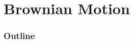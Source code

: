 


\newcommand{\RR}{\mathbf R}
\newcommand{\CC}{\mathbf C}
\newcommand{\ZZ}{\mathbf Z}
\newcommand{\ZZn}[1]{\ZZ/{#1}\ZZ}
\newcommand{\QQ}{\mathbf Q}
\newcommand{\rr}{\mathbb R}
\newcommand{\cc}{\mathbb C}
\newcommand{\zz}{\mathbb Z}
\newcommand{\zzn}[1]{\zz/{#1}\zz}
\newcommand{\qq}{\mathbb Q}
\newcommand{\calM}{\mathcal M}
\newcommand{\latex}{\LaTeX}
\newcommand{\tex}{\TeX}
\newcommand{\sm}{\setminus} 


\newcommand{\tfix}{\rule{0pt}{2.6ex}}
\newcommand{\bfix}{\rule[-1.2ex]{0pt}{0pt}}



\newcommand{\intf}[1]{\int_a^b{#1}\,dx}
\newcommand{\intfb}[3]{\int_{#1}^{#2}{#3}\,dx}
\newcommand{\marginalfootnote}[1]{%
        \footnote{#1}
        \marginpar[\hfill{\sf\thefootnote}]{{\sf\thefootnote}}}
\newcommand{\edit}[1]{\marginalfootnote{#1}}


\newcommand{\Tr}{\operatorname {Tr}}
\newcommand{\GL}{\operatorname {GL}}
\newcommand{\SL}{\operatorname {SL}}
\newcommand{\Prob}{\operatorname {Prob}}
\newcommand{\re}{\operatorname {Re}}
\newcommand{\im}{\operatorname {Im}}





\section{Brownian Motion}
\begin{frame}
  \frametitle{Outline}
  \tableofcontents[ currentsection ]
\end{frame}

